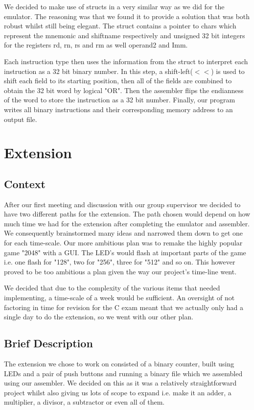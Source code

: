 \documentclass[a4paper,12pt]{article}
\begin{document}
We decided to make use of structs in a very similar way as we did for the emulator. The reasoning was that we found it to provide a solution that was both robust whilst still being elegant. The struct contains a pointer to chars which represent the mnemonic and shiftname respectively and unsigned 32 bit integers for the registers rd, rn, rs and rm as well operand2 and Imm.

Each instruction type then uses the information from the struct to interpret each instruction as a 32 bit binary number. In this step, a shift-left($<<$) is used to shift each field to its starting position, then all of the fields are combined to obtain the 32 bit word by logical "OR". Then the assembler flips the endianness of the word to store the instruction as a 32 bit number. Finally, our program writes all binary instructions and their corresponding
memory address to an output file.  

\section{Extension}

\subsection{Context}
After our first meeting and discussion with our group supervisor we decided to have two different paths for the extension. The path chosen would depend on how much time we had for the extension after completing the emulator and assembler. We consequently brainstormed many ideas and narrowed them down to get one for each time-scale. Our more ambitious plan was to remake the highly popular game "2048" with a GUI. The LED's would flash at important parts of the game i.e. one flash for "128", two for "256", three for "512" and so on. This however proved to be too ambitious a plan given the way our project's time-line went. 

We decided that due to the complexity of the various items that needed implementing, a time-scale of a week would be sufficient. An oversight of not factoring in time for revision for the C exam meant that we actually only had a single day to do the extension, so we went with our other plan.

\subsection{Brief Description}
The extension we chose to work on consisted of a binary counter, built using LEDs and a pair of push buttons and running a binary file which we assembled using our assembler. We decided on this as it was a relatively straightforward project whilst also giving us lots of scope to expand i.e. make it an adder, a multiplier, a divisor, a subtractor or even all of them.
\end{document}
